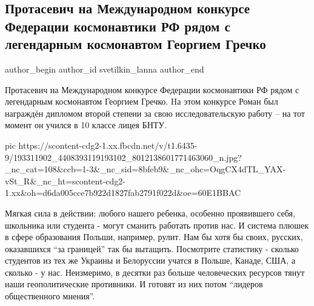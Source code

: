  
 
 
 
 
 
\subsection{Протасевич на Международном конкурсе Федерации космонавтики РФ рядом с легендарным космонавтом Георгием Гречко}
\label{sec:31_05_2021.fb.svetilkin_lanna.1.protasevich_kosmonavtika}
\ifcmt
 author_begin
   author_id svetilkin_lanna
 author_end
\fi

Протасевич на Международном конкурсе Федерации космонавтики РФ рядом с
легендарным космонавтом Георгием Гречко. Hа этом конкурсе Роман был награждён
дипломом второй степени за свою исследовательскую работу – на тот момент он
учился в 10 классе лицея БНТУ.

\ifcmt
  pic https://scontent-cdg2-1.xx.fbcdn.net/v/t1.6435-9/193311902_4408393119193102_8012138601771463060_n.jpg?_nc_cat=108&ccb=1-3&_nc_sid=8bfeb9&_nc_ohc=OqgCX4dTL_YAX-vSt_R&_nc_ht=scontent-cdg2-1.xx&oh=d6da005cce7b922d1827fab2791f022d&oe=60E1BBAC
\fi

Мягкая сила в действии: любого нашего ребенка, особенно проявившего себя,
школьника или студента - могут сманить работать против нас. И система плюшек в
сфере образования Польши, например, рулит. Нам бы хотя бы своих, русских,
оказавшихся \enquote{за границей} так бы вытащить. Посмотрите статистику -
сколько студентов из тех же Украины и Белоруссии учатся в Польше, Канаде, США,
а сколько - у нас. Неизмеримо, в десятки раз больше человеческих ресурсов тянут
наши геополитические противники. И готовят из них потом \enquote{лидеров
общественного мнения}.

